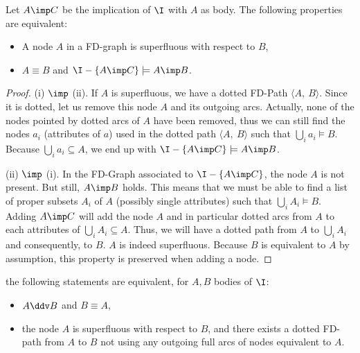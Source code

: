 \begin{proposition}\label{prop:maier.equiv_sup_sub} Let $A \imp C$ be the implication of $\I$ with $A$ as body. The following properties are equivalent:
\begin{itemize}
	\item[(i)] A node $A$ in a FD-graph is superfluous with respect to $B$,
	\item[(ii)] $A \equiv B$ and $\I - \{A \imp C \} \models A \imp B$.
\end{itemize}
\end{proposition}

\begin{proof} (i) $\imp$ (ii). If $A$ is superfluous, we have a dotted FD-Path
$\langle A, \ B \rangle$. Since it is dotted, let us remove this node $A$ 
and its outgoing arcs. Actually, none of the nodes pointed by dotted arcs of $A$
have been removed, thus we can still find the nodes $a_i$ (attributes of 
$a$) used in the dotted path $\langle A, \ B \rangle$ such that $\bigcup_i a_i 
\models B$. Because $\bigcup_i a_i \subseteq A$, we end up with $\I - \{A 
\imp C \} \models A \imp B$.

\vspace{1.2em}

(ii) $\imp$ (i). In the FD-Graph associated to $\I - \{A \imp C \}$, the 
node $A$ is not present. But still, $A \imp B$ holds. This means that we must be
able to find a list of proper subsets $A_i$ of $A$ (possibly single 
attributes) such that $\bigcup_{i} A_i \models B$. Adding $A \imp C$ will add the node $A$ and in particular dotted arcs from $A$ to each attributes of $\bigcup_{i} A_i \subseteq A$. Thus, we will have a dotted path from $A$ to $\bigcup_{i} A_i$ and consequently, to $B$. $A$ is indeed superfluous. Because $B$ is equivalent to $A$ by assumption, this property is preserved when adding a node.
	
\end{proof}


\begin{proposition} \label{prop:maier.equiv_ssup_dd}
the following statements are equivalent, for $A, B$ bodies of $\I$:
\begin{itemize}
	\item[(i)] $A \ddv B$ and $B \equiv A$,
	\item[(ii)] the node $A$ is superfluous with respect to $B$, and there 
	exists 
	a dotted FD-path from $A$ to $B$ not using any outgoing full arcs of
	nodes equivalent to $A$.
\end{itemize}
	
\end{proposition}


